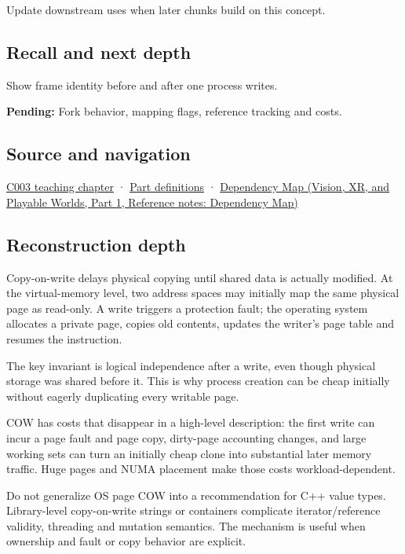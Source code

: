 Update downstream uses when later chunks build on this concept.

\subsection{Recall and next depth}\label{appendix-7a06e5baac04-recall-and-next-depth}

\hypertarget{appendix-7a06e5baac04-recall-and-next-depth}{}

Show frame identity before and after one process writes.

\textbf{Pending:} Fork behavior, mapping flags, reference tracking and costs.

\subsection{Source and navigation}\label{appendix-7a06e5baac04-source-and-navigation}

\hypertarget{appendix-7a06e5baac04-source-and-navigation}{}

\hyperref[01-foundations-i-ch002-where-the-bytes-live]{C003 teaching chapter} · \hyperref[appendix-fd090d982a15-m003---parts-41-60]{Part definitions} · \href{../07-Vision-XR-and-Playable-Worlds-P01/main.pdf\#appendix-4ad47bdd269a}{Dependency Map (Vision, XR, and Playable Worlds, Part 1, Reference notes: Dependency Map)}

\subsection{Reconstruction depth}\label{appendix-7a06e5baac04-reconstruction-depth}

\hypertarget{appendix-7a06e5baac04-reconstruction-depth}{}

Copy-on-write delays physical copying until shared data is actually modified. At the virtual-memory level, two address spaces may initially map the same physical page as read-only. A write triggers a protection fault; the operating system allocates a private page, copies old contents, updates the writer's page table and resumes the instruction.

The key invariant is logical independence after a write, even though physical storage was shared before it. This is why process creation can be cheap initially without eagerly duplicating every writable page.

COW has costs that disappear in a high-level description: the first write can incur a page fault and page copy, dirty-page accounting changes, and large working sets can turn an initially cheap clone into substantial later memory traffic. Huge pages and NUMA placement make those costs workload-dependent.

Do not generalize OS page COW into a recommendation for C++ value types. Library-level copy-on-write strings or containers complicate iterator/reference validity, threading and mutation semantics. The mechanism is useful when ownership and fault or copy behavior are explicit.
